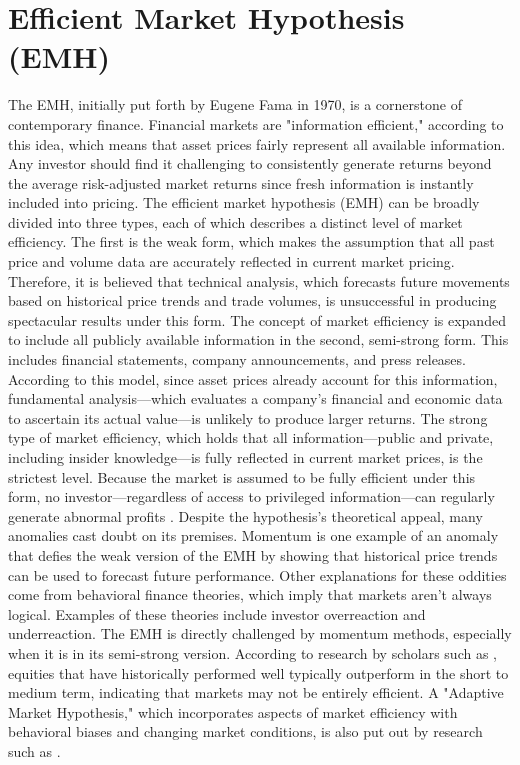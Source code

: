 \documentclass[11pt,a4paper,english,oneside]{book}
\begin{document}
\section{Efficient Market Hypothesis (EMH)}
The EMH, initially put forth by Eugene Fama in 1970, is a cornerstone of contemporary finance. Financial markets are "information efficient," according to this idea, which means that asset prices fairly represent all available information. Any investor should find it challenging to consistently generate returns beyond the average risk-adjusted market returns since fresh information is instantly included into pricing.
The efficient market hypothesis (EMH) can be broadly divided into three types, each of which describes a distinct level of market efficiency. The first is the weak form, which makes the assumption that all past price and volume data are accurately reflected in current market pricing. Therefore, it is believed that technical analysis, which forecasts future movements based on historical price trends and trade volumes, is unsuccessful in producing spectacular results under this form. The concept of market efficiency is expanded to include all publicly available information in the second, semi-strong form. This includes financial statements, company announcements, and press releases. According to this model, since asset prices already account for this information, fundamental analysis—which evaluates a company's financial and economic data to ascertain its actual value—is unlikely to produce larger returns. The strong type of market efficiency, which holds that all information—public and private, including insider knowledge—is fully reflected in current market prices, is the strictest level. Because the market is assumed to be fully efficient under this form, no investor—regardless of access to privileged information—can regularly generate abnormal profits \parencite{fama1970efficient}. 
Despite the hypothesis's theoretical appeal, many anomalies cast doubt on its premises. Momentum is one example of an anomaly that defies the weak version of the EMH by showing that historical price trends can be used to forecast future performance. Other explanations for these oddities come from behavioral finance theories, which imply that markets aren't always logical. Examples of these theories include investor overreaction and underreaction.
The EMH is directly challenged by momentum methods, especially when it is in its semi-strong version. According to research by scholars such as \cite{jegadeesh1993returns}, equities that have historically performed well typically outperform in the short to medium term, indicating that markets may not be entirely efficient. A "Adaptive Market Hypothesis," which incorporates aspects of market efficiency with behavioral biases and changing market conditions, is also put out by research such as \cite{lo2004adaptive}.
\end{document}
